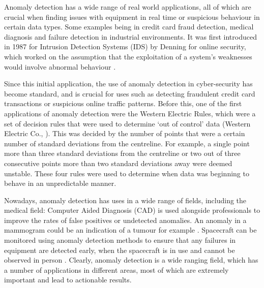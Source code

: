 Anomaly detection has a wide range of real world applications, all of which are crucial when finding issues with equipment in real time or suspicious behaviour in certain data types. Some examples being in credit card fraud detection, medical diagnosis and failure detection in industrial environments. It was first introduced in 1987 for Intrusion Detection Systems (IDS) by Denning for online security, which worked on the assumption that the exploitation of a system's weaknesses would involve abnormal behaviour \cite{1702202}. 

Since this initial application, the use of anomaly detection in cyber-security has become standard, and is crucial for uses such as detecting fraudulent credit card transactions or suspicious online traffic patterns. Before this, one of the first applications of anomaly detection were the Western Electric Rules, which were a set of decision rules that were used to determine `out of control' data (Western Electric Co., \citeyear{statistical_quality_control_handbook_1956}). This was decided by the number of points that were a certain number of standard deviations from the centreline. For example, a single point more than three standard deviations from the centreline or two out of three consecutive points more than two standard deviations away were deemed unstable. These four rules were used to determine when data was beginning to behave in an unpredictable manner. 

Nowadays, anomaly detection has uses in a wide range of fields, including the medical field: Computer Aided Diagnosis (CAD) is used alongside professionals to improve the rates of false positives or undetected anomalies. An anomaly in a mammogram could be an indication of a tumour for example \cite{Sajda2003AMP}. Spacecraft can be monitored using anomaly detection methods to ensure that any failures in equipment are detected early, when the spacecraft is in use and cannot be observed in person \cite{Fujimaki:2005:ADM:2140831.2140938}. Clearly, anomaly detection is a wide ranging field, which has a number of applications in different areas, most of which are extremely important and lead to actionable results.

